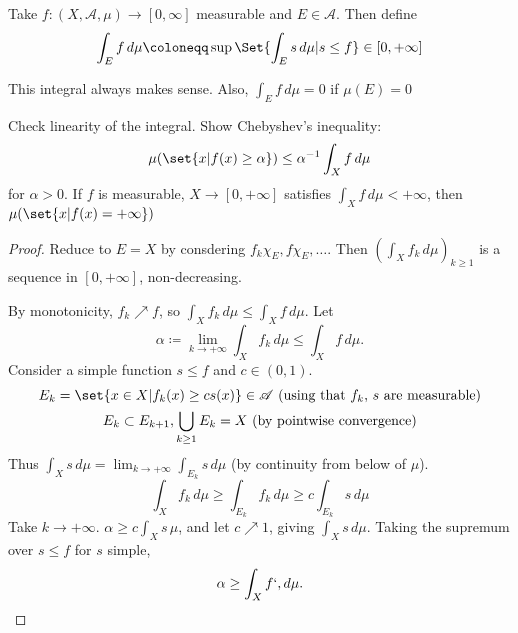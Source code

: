 \documentclass{article}
\begin{document}
\begin{defi}
    Take $f:(X, \mathscr{A}, \mu) \to [0, \infty]$ measurable and $E \in \mathscr{A}$.
    Then define
    \begin{equation*}
        \int_E f \, d \mu \coloneqq \sup\Set{\int_E s \, d\mu | s \leq f} \in [0, +\infty]
    \end{equation*}
\end{defi}
\begin{remark}
    This integral always makes sense. Also, $\int_E f \, d\mu = 0$ if $\mu(E) = 0$
\end{remark}
\begin{ex}
    Check linearity of the integral. Show Chebyshev's inequality:
    \begin{equation*}
        \mu(\set{x | f(x) \geq \alpha}) \leq \alpha^{-1} \int_X f \, d\mu
    \end{equation*}
    for $\alpha>0$.
    If $f$ is measurable, $X \to [0, +\infty]$ satisfies $\int_X f \, d\mu < +\infty$, then $\mu(\set{x | f(x) = +\infty})$
\end{ex}

\begin{proof}
    Reduce to $E = X$ by consdering $f_k \chi_E, f \chi_E, \dotsc$.
    Then $\left(\int_X f_k \, d\mu\right)_{k \geq 1}$ is a sequence in $[0, +\infty]$, non-decreasing.

    By monotonicity, $f_k \nearrow f$, so $\int_X f_k \, d\mu \leq \int_X f \, d\mu$.
    Let
    \begin{equation*}
        \alpha \coloneqq \lim_{k \to +\infty} \int_X f_k \, d\mu \leq \int_X f \, d\mu.
    \end{equation*}
    Consider a simple function $s \leq f$ and $c \in (0, 1)$.
    \begin{gather*}
        E_k = \set{x\in X | f_k(x) \geq c s(x)} \in \mathscr{A} \text{ (using that $f_k$, $s$ are measurable)}\\
        E_k \subset E_{k+1}, \bigcup_{k \geq 1} E_k = X \text{ (by pointwise convergence)}
    \end{gather*}
    Thus $\int_X s \, d\mu = \lim_{k \to +\infty} \int_{E_k} s \, d\mu$ (by continuity from below of $\mu$).
    \begin{equation*}
        \int_X f_k \, d\mu \geq \int_{E_k} f_k \, d \mu \geq c \int_{E_k} s \, d \mu
    \end{equation*}
    Take $k \to +\infty$. $\alpha \geq c \int_X s \, \mu$, and let $c \nearrow 1$, giving $\int_X s \, d\mu$.
    Taking the supremum over $s \leq f$ for $s$ simple,
    \begin{equation*}
        \alpha \geq \int_X f `, d\mu.\qedhere
    \end{equation*}
\end{proof}
\end{document}
